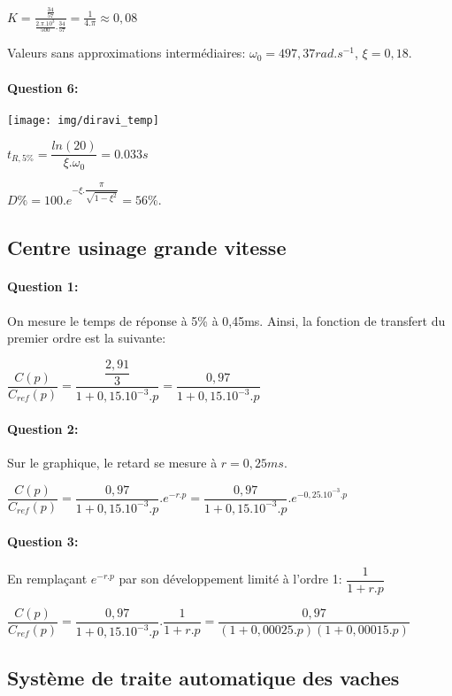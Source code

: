 $K=\frac{\frac{34}{57}}{\frac{2.\pi.10^3}{500}.\frac{34}{57}}=\frac{1}{4.\pi}\approx0,08$

Valeurs sans approximations intermédiaires:
$\omega_0=497,37rad.s^{-1}$, $\xi=0,18$.

\paragraph{Question 6:}

\begin{center}
 \texttt{[image: img/diravi\_temp]}
\end{center}

$t_{R,5\%}=\dfrac{ln(20)}{\xi.\omega_0}=0.033s$

$D\%=100.e^{-\xi.\dfrac{\pi}{\sqrt{1-\xi^2}}}=56\%$.

\subsection{Centre usinage grande vitesse}

\paragraph{Question 1:} On mesure le temps de réponse à 5\% à 0,45ms. Ainsi, la fonction de transfert du premier ordre est la suivante:

$\dfrac{C(p)}{C_{ref}(p)}=\dfrac{\dfrac{2,91}{3}}{1+0,15.10^{-3}.p}=\dfrac{0,97}{1+0,15.10^{-3}.p}$

\paragraph{Question 2:} Sur le graphique, le retard se mesure à $r=0,25ms$.

$\dfrac{C(p)}{C_{ref}(p)}=\dfrac{0,97}{1+0,15.10^{-3}.p}.e^{-r.p}=\dfrac{0,97}{1+0,15.10^{-3}.p}.e^{-0,25.10^{-3}.p}$

\paragraph{Question 3:} En remplaçant $e^{-r.p}$ par son développement limité à l'ordre 1: $\dfrac{1}{1+r.p}$

$\dfrac{C(p)}{C_{ref}(p)}=\dfrac{0,97}{1+0,15.10^{-3}.p}.\dfrac{1}{1+r.p}=\dfrac{0,97}{(1+0,00025.p)(1+0,00015.p)}$

\subsection{Système de traite automatique des vaches}

